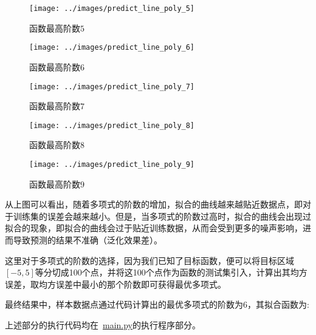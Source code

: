 \documentclass[UTF8]{article} %
\begin{document}
    \begin{figure}[H]
        \begin{minipage}[b]{0.24\linewidth}
            \centering
            \texttt{[image: ../images/predict\_line\_poly\_5]}
            \caption{函数最高阶数$5$}
            \label{fig:poly_5}
        \end{minipage}
        \begin{minipage}[b]{0.24\linewidth}
            \centering
            \texttt{[image: ../images/predict\_line\_poly\_6]}
            \caption{函数最高阶数$6$}
            \label{fig:poly_6}
        \end{minipage}
        \begin{minipage}[b]{0.24\linewidth}
            \centering
            \texttt{[image: ../images/predict\_line\_poly\_7]}
            \caption{函数最高阶数$7$}
            \label{fig:poly_7}
        \end{minipage}
        \begin{minipage}[b]{0.24\linewidth}
            \centering
            \texttt{[image: ../images/predict\_line\_poly\_8]}
            \caption{函数最高阶数$8$}
            \label{fig:poly_8}
        \end{minipage}
    \end{figure}

    \begin{figure}[H]
        \begin{minipage}[b]{0.24\linewidth}
            \centering
            \texttt{[image: ../images/predict\_line\_poly\_9]}
            \caption{函数最高阶数$9$}
            \label{fig:poly_9}
        \end{minipage}
    \end{figure}

    从上图可以看出，随着多项式的阶数的增加，拟合的曲线越来越贴近数据点，即对于训练集的误差会越来越小。但是，当多项式的阶数过高时，拟合的曲线会出现过拟合的现象，即拟合的曲线会过于贴近训练数据，从而会受到更多的噪声影响，进而导致预测的结果不准确（泛化效果差）。

    这里对于多项式的阶数的选择，因为我们已知了目标函数，便可以将目标区域$[-5, 5]$等分切成100个点，并将这100个点作为函数的测试集引入，计算出其均方误差，取均方误差中最小的那个阶数即可获得最优多项式。

    最终结果中，样本数据点通过代码计算出的最优多项式的阶数为$6$，其拟合函数为:
    

    上述部分的执行代码均在~\href{run:main.py}{main.py}的执行程序部分。
\end{document}
